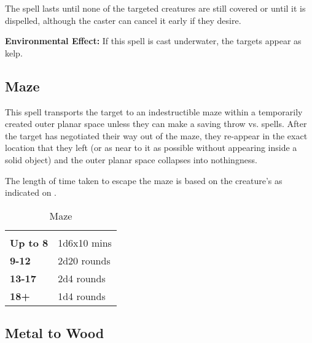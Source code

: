 \begin{multicols*}{2}
The spell lasts until none of the targeted creatures are still covered or until it is dispelled, although the caster can cancel it early if they desire.

\textbf{Environmental Effect:} If this spell is cast underwater, the targets appear as kelp.

\subsection{Maze}\label{spell:Maze}

This spell transports the target to an indestructible maze within a temporarily created outer planar space unless they can make a saving throw vs. spells. After the target has negotiated their way out of the maze, they re-appear in the exact location that they left (or as near to it as possible without appearing inside a solid object) and the outer planar space collapses into nothingness.

The length of time taken to escape the maze is based on the creature’s  as indicated on .

\begin {table}[H]
	\caption{Maze}\label{tab:Maze}
  \begin{tabularx}{\columnwidth}{>{\bfseries}YY}
	 & \\
	Up to 8 & 1d6x10 mins\\
	9-12 & 2d20 rounds\\
	13-17 & 2d4 rounds\\
	18+ & 1d4 rounds
  \end {tabularx}
\end {table}

\subsection{Metal to Wood}\label{spell:Metal to Wood}


\end{multicols*}
